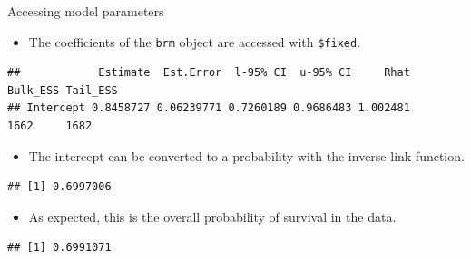 \documentclass[
  ignorenonframetext,
]{beamer}
\newenvironment{Shaded}{\begin{snugshade}}{\end{snugshade}}
\newcommand{\DecValTok}[1]{\textcolor[rgb]{0.00,0.00,0.81}{#1}}
\newcommand{\KeywordTok}[1]{\textcolor[rgb]{0.13,0.29,0.53}{\textbf{#1}}}
\newcommand{\NormalTok}[1]{#1}
\newcommand{\OperatorTok}[1]{\textcolor[rgb]{0.81,0.36,0.00}{\textbf{#1}}}
\providecommand{\tightlist}{%
  \setlength{\itemsep}{0pt}\setlength{\parskip}{0pt}}
\begin{document}
\begin{frame}[fragile]{Accessing model parameters}
\protect\hypertarget{accessing-model-parameters}{}

\begin{itemize}
\tightlist
\item
  The coefficients of the \texttt{brm} object are accessed with
  \texttt{\$fixed}.
\end{itemize}

\scriptsize

\begin{Shaded}
\end{Shaded}

\begin{verbatim}
##            Estimate  Est.Error  l-95% CI  u-95% CI     Rhat Bulk_ESS Tail_ESS
## Intercept 0.8458727 0.06239771 0.7260189 0.9686483 1.002481     1662     1682
\end{verbatim}

\normalsize

\begin{itemize}
\tightlist
\item
  The intercept can be converted to a probability with the inverse link
  function.
\end{itemize}

\scriptsize

\begin{Shaded}
\end{Shaded}

\begin{verbatim}
## [1] 0.6997006
\end{verbatim}

\normalsize

\begin{itemize}
\tightlist
\item
  As expected, this is the overall probability of survival in the data.
\end{itemize}

\scriptsize

\begin{Shaded}
\end{Shaded}

\begin{verbatim}
## [1] 0.6991071
\end{verbatim}

\end{frame}
\end{document}
